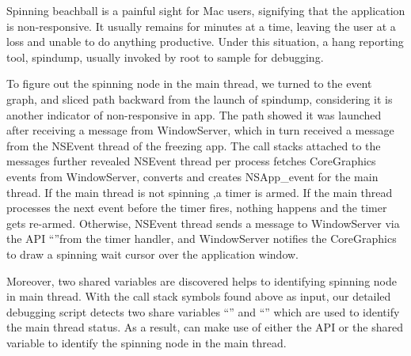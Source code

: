 Spinning beachball is a painful sight for Mac users, signifying that the
application is non-responsive. It usually remains for minutes at a time, leaving
the user at a loss and unable to do anything productive. Under this situation, a
hang reporting tool, spindump, usually invoked by root to sample for debugging.

To figure out the spinning node in the main thread, we turned to the event
graph, and sliced path backward from the launch of spindump, considering it is
another indicator of non-responsive in app. The path showed it was launched
after receiving a message from WindowServer, which in turn received a message
from the NSEvent thread of the freezing app. The call stacks attached to the
messages further revealed NSEvent thread per process fetches CoreGraphics events
from WindowServer, converts and creates NSApp\_event for the main thread. If the
main thread is not spinning ,a timer is armed. If the main thread processes
the next event before the timer fires, nothing happens and the timer gets
re-armed. Otherwise, NSEvent thread sends a message to WindowServer via the
API ``''from the timer handler, and WindowServer
notifies the CoreGraphics to draw a spinning wait cursor over the application
window.

Moreover, two shared variables are discovered helps \xxx to identifying
spinning node in main thread. With the call stack symbols found above
as input, our detailed debugging script detects two share variables
``'' and ``'' which
are used to identify the main thread status. As a result, \xxx can make use of
either the API or the shared variable to identify the spinning node in the main
thread.%
